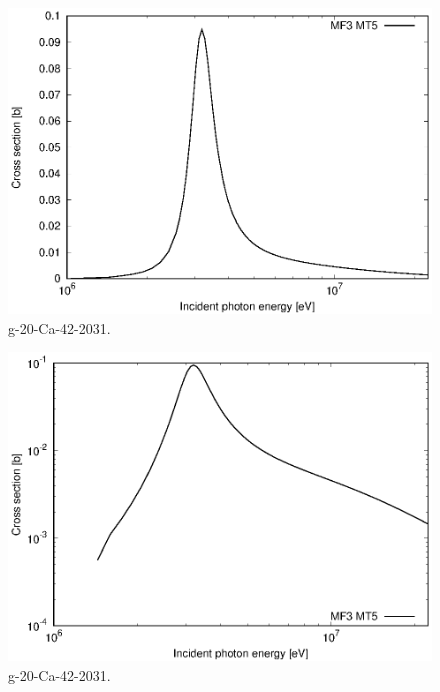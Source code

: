 \begin{figure}
 \includegraphics[width=\linewidth]{eps/g_20-Ca-42_2031.eps}
  \caption{g-20-Ca-42-2031.}
\end{figure}
\begin{figure}
 \includegraphics[width=\linewidth]{eps-log/g_20-Ca-42_2031.eps}
 \caption{g-20-Ca-42-2031.}
\end{figure}
\newpage \clearpage

